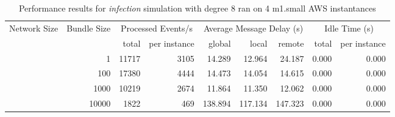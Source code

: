 \begin{table}
	  \caption[Performance results, \emph{infection:8 on 4 m1.small instances }]{ Performance results for \emph{ infection } simulation with degree 8 ran on 4 m1.small AWS instantances }
	\begin{tabular}{rrrrrrrrr}
	\hline\noalign{\smallskip}

	Network Size &
	Bundle Size &
	\multicolumn{2}{c}{Processed Events/s} & 
	\multicolumn{3}{c}{Average Message Delay (s)} & 
	\multicolumn{2}{c}{Idle Time (s)}  \\

	 & 
	 & 
	 total & per instance
     & global & local & remote
     & total & per instance\\

			
				\noalign{\smallskip}\hline
				\multirow{ 4 }{*}{ 40000 } &
				
					
					 
					\multirow{ 1 }{*}{ 1 } &
					
						
							    
							     11717  & 3105  
	                           & 14.289 & 12.964 & 24.187
	                           & 0.000 & 0.000  \\
	                
	            
					 &  
					 
					\multirow{ 1 }{*}{ 100 } &
					
						
							    
							     17380  & 4444  
	                           & 14.473 & 14.054 & 14.615
	                           & 0.000 & 0.000  \\
	                
	            
					 &  
					 
					\multirow{ 1 }{*}{ 1000 } &
					
						
							    
							     10219  & 2674  
	                           & 11.864 & 11.350 & 12.062
	                           & 0.000 & 0.000  \\
	                
	            
					 &  
					 
					\multirow{ 1 }{*}{ 10000 } &
					
						
							    
							     1822  & 469  
	                           & 138.894 & 117.134 & 147.323
	                           & 0.000 & 0.000  \\
	                

\end{tabular}
\end{table}
